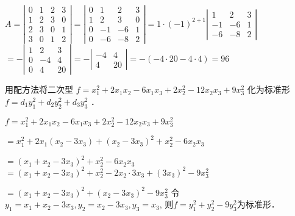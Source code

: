 \documentclass{jnuexam}
\begin{document}
\bigskip

\begin{solution}
$A = \left|\begin{array}{cccc}
    0 & 1 & 2 & 3\\
    1 & 2 & 3 & 0\\
    2 & 3 & 0 & 1\\
    3 & 0 & 1 & 2
  \end{array}\right| = \left|\begin{array}{cccc}
    0 & 1 & 2 & 3\\
    1 & 2 & 3 & 0\\
    0 & - 1 & - 6 & 1\\
    0 & - 6 & - 8 & 2
  \end{array}\right| = 1 \cdot (- 1)^{2 + 1} \left|\begin{array}{ccc}
    1 & 2 & 3\\
    - 1 & - 6 & 1\\
    - 6 & - 8 & 2
  \end{array}\right|$ 
\qquad $= -\left|\begin{array}{ccc}
    1 & 2 & 3\\
    0 & - 4 & 4\\
    0 & 4 & 20
  \end{array}\right| = - \left|\begin{array}{cc}
    - 4 & 4\\
    4 & 20
  \end{array}\right| = -(-4\cdot20-4\cdot4) = 96$ 
\end{solution}

\vfill

\begin{problem}
用配方法将二次型 $f = x_1^2 + 2 x_1 x_2 - 6 x_1 x_3 + 2 x_2^2 - 12
x_2 x_3 + 9 x^2_3$ 化为标准形 $f = d_1 y^2_1 + d_2 y^2_2 + d_3 y^2_3$ ．
\end{problem}

\bigskip

\begin{solution}
$f = x_1^2 + 2 x_1 x_2 - 6 x_1 x_3 + 2 x_2^2 - 12 x_2 x_3 + 9 x^2_3$ \par
\qquad$= x_1^2 + 2 x_1 (x_2 - 3 x_3) + (x_2 - 3 x_3)^2 + x_2^2 - 6 x_2 x_3 $ \par
\qquad$= (x_1 + x_2 - 3 x_3)^2 + x_2^2 - 6 x_2 x_3$ 
\qquad$= (x_1 + x_2 - 3 x_3)^2 + x_2^2 - 2 x_2 \cdot 3 x_3 + (3 x_3)^2 - 9x_3^2$ \par
\qquad$= (x_1 + x_2 - 3 x_3)^2 + (x_2 - 3 x_3)^2 - 9 x_3^2$ 
令$y_1 = x_1 + x_2 - 3 x_3, y_2 = x_2 - 3 x_3, y_3 = x_3$, \newline
则$f = y_1^2 + y_2^2 - 9y_3^2$为标准形．
\end{solution}
\end{document}
